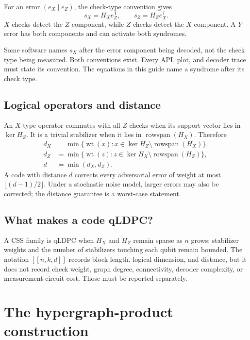 \documentclass[11pt,letterpaper]{article}
\newcommand{\wt}{\operatorname{wt}}
\newcommand{\rowspan}{\operatorname{rowspan}}
\begin{document}
For an error $(e_X\mid e_Z)$, the check-type convention gives
\begin{equation}
  s_X=H_Xe_Z^{\mathsf T},\qquad s_Z=H_Ze_X^{\mathsf T}.
  \label{eq:css-syndrome}
\end{equation}
$X$ checks detect the $Z$ component, while $Z$ checks detect the $X$ component. A $Y$ error has
both components and can activate both syndromes.

\begin{warningbox}
Some software names $s_X$ after the error component being decoded, not the check type being
measured. Both conventions exist. Every API, plot, and decoder trace must state its convention.
The equations in this guide name a syndrome after its check type.
\end{warningbox}

\subsection{Logical operators and distance}

An $X$-type operator commutes with all $Z$ checks when its support vector lies in $\ker H_Z$.
It is a trivial stabilizer when it lies in $\rowspan(H_X)$. Therefore
\begin{align}
  d_X &= \min\{\wt(x):x\in\ker H_Z\setminus\rowspan(H_X)\},\\
  d_Z &= \min\{\wt(z):z\in\ker H_X\setminus\rowspan(H_Z)\},\\
  d &= \min(d_X,d_Z).
\end{align}
A code with distance $d$ corrects every adversarial error of weight at most
$\lfloor(d-1)/2\rfloor$. Under a stochastic noise model, larger errors may also be corrected; the
distance guarantee is a worst-case statement.

\subsection{What makes a code qLDPC?}

A CSS family is qLDPC when $H_X$ and $H_Z$ remain sparse as $n$ grows: stabilizer weights and the
number of stabilizers touching each qubit remain bounded. The notation $[[n,k,d]]$ records block
length, logical dimension, and distance, but it does not record check weight, graph degree,
connectivity, decoder complexity, or measurement-circuit cost. Those must be reported separately.

\section{The hypergraph-product construction}
\end{document}
